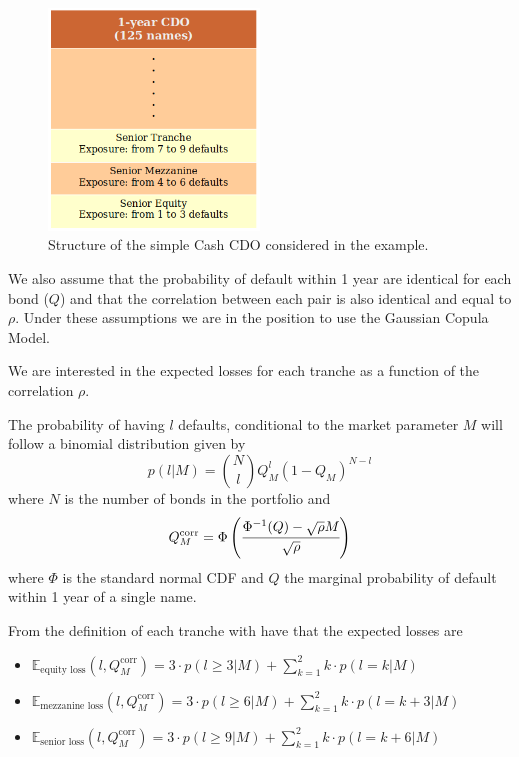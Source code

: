 \begin{figure}[htb]
	\centering
	\includegraphics[width=0.5\textwidth]{figures/ex_cdo_1}
	\caption{Structure of the simple Cash CDO considered in the example.}
	\label{fig:cdo_ex_1}
\end{figure}

We also assume that the probability of default within 1 year are identical for each bond ($Q$) and that the correlation between each pair is also identical and equal to $\rho$.
Under these assumptions we are in the position to use the Gaussian Copula Model. 

We are interested in the expected losses for each tranche as a function of the correlation $\rho$.

The probability of having $l$ defaults, conditional to the market parameter $M$ will follow a binomial distribution given by
\begin{equation}
p(l|M) = \binom{N}{l}Q_M^l (1-Q_M)^{N-l}
\label{eq:def_prob_ex_cdo_1}
\end{equation}
where $N$ is the number of bonds in the portfolio and 
\begin{equation}
Q_M^{\textrm{corr}} = \Phi\left(\cfrac{\Phi^{-1}(Q)-\sqrt{\rho}M}{\sqrt{\-\rho}}\right)
\end{equation}
where $\Phi$ is the standard normal CDF and $Q$ the marginal probability of default within 1 year of a single name.

From the definition of each tranche with have that the expected losses are
\begin{itemize}
	\item $\mathbb{E}_{\textrm{equity loss}}(l, Q_M^{\textrm{corr}})=3\cdot p(l\ge 3|M) + \sum_{k=1}^{2}k\cdot p(l=k|M)$
	\item $\mathbb{E}_{\textrm{mezzanine loss}}(l, Q_M^{\textrm{corr}})=3\cdot p(l\ge 6|M) + \sum_{k=1}^{2}k\cdot p(l=k+3|M)$
	\item $\mathbb{E}_{\textrm{senior loss}}(l, Q_M^{\textrm{corr}})=3\cdot p(l\ge 9|M) + \sum_{k=1}^{2}k\cdot p(l=k+6|M)$
\end{itemize}
	

